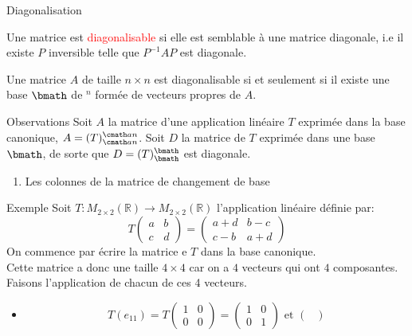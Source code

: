 \begin{parag}{Diagonalisation}
    \begin{definition}
        Une matrice est \textcolor{red}{diagonalisable} si elle est semblable à une matrice diagonale, i.e il existe $P$ inversible telle que $P^{-1}AP$ est diagonale.
    \end{definition}
    \begin{theoreme}
        Une matrice $A$ de taille $n\times n$ est diagonalisable si et seulement si il existe une base $\bmath$ de \R$^n$ formée de vecteurs propres de $A$.
    \end{theoreme}
    \begin{subparag}{Observations}
        Soit $A$ la matrice d'une application linéaire $T$ exprimée dans la base canonique, $A = (T)_{\cmath an}^{\cmath an}$. Soit $D$ la matrice  de $T$ exprimée dans une base $\bmath$, de sorte que $D = (T)_\bmath^\bmath$ est diagonale.
        \begin{enumerate}
            \item Les colonnes de la matrice de changement de base 
        \end{enumerate}
    \end{subparag}
    \begin{subparag}{Exemple}
        Soit $T: M_{2\times 2}(\mathbb{R}) \to M_{2\times 2}(\mathbb{R})$ l’application linéaire définie par:
        \[T\begin{pmatrix}
            a & b \\ c & d
        \end{pmatrix} = \begin{pmatrix}
            a + d & b - c\\ c-b & a + d
        \end{pmatrix}\]
        On commence par écrire la matrice e $T$ dans la base canonique.
        \\
        Cette matrice a donc une taille $4 \times 4$ car on a $4$ vecteurs qui ont $4$ composantes. Faisons l’application de chacun de ces 4 vecteurs.
        \begin{itemize}
            \item \[T(e_{11}) = T\begin{pmatrix}
                1 & 0 \\ 0 & 0
            \end{pmatrix} = \begin{pmatrix}
                1 & 0 \\ 0 & 1
            \end{pmatrix} \text{ et } \begin{pmatrix}

\end{pmatrix}\]
\end{itemize}
\end{subparag}
\end{parag}

